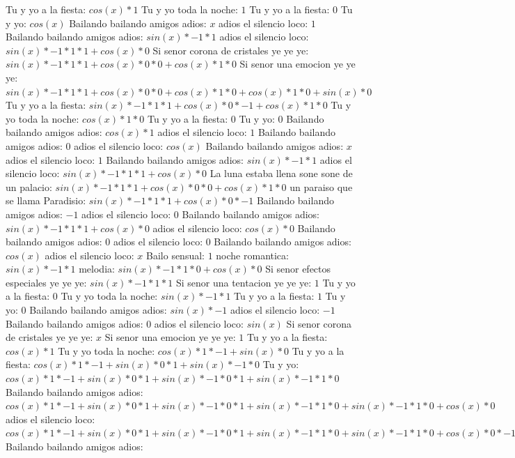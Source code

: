 \documentclass{article}
\begin{document}
\newline Tu y yo a la fiesta: $cos(x)*1$ Tu y yo toda la noche: $1$ Tu y yo a la fiesta: $0$  \newline Tu y yo: $cos(x)$  \newline Bailando bailando amigos adios: $x$ adios el silencio loco: $1$  \newline Bailando bailando amigos adios: $sin(x)*-1*1$ adios el silencio loco: $sin(x)*-1*1*1+cos(x)*0$ Si senor corona de cristales ye ye ye: ${sin(x)*-1*1*1+cos(x)*0}*0+cos(x)*1*0$ Si senor una emocion ye ye ye: ${sin(x)*-1*1*1+cos(x)*0}*0+cos(x)*1*0+cos(x)*1*0+sin(x)*0$ Tu y yo a la fiesta: ${sin(x)*-1*1*1+cos(x)*0}*-1+cos(x)*1*0$  \newline Tu y yo toda la noche: $cos(x)*1*0$ Tu y yo a la fiesta: $0$ Tu y yo: $0$  \newline Bailando bailando amigos adios: $cos(x)*1$ adios el silencio loco: $1$ Bailando bailando amigos adios: $0$  \newline adios el silencio loco: $cos(x)$  \newline Bailando bailando amigos adios: $x$ adios el silencio loco: $1$  \newline Bailando bailando amigos adios: $sin(x)*-1*1$ adios el silencio loco: $sin(x)*-1*1*1+cos(x)*0$ La luna estaba llena sone sone de un palacio: ${sin(x)*-1*1*1+cos(x)*0}*0+cos(x)*1*0$ un paraiso que se llama Paradisio: ${sin(x)*-1*1*1+cos(x)*0}*-1$ Bailando bailando amigos adios: $-1$ adios el silencio loco: $0$  \newline Bailando bailando amigos adios: $sin(x)*-1*1*1+cos(x)*0$  \newline adios el silencio loco: $cos(x)*0$ Bailando bailando amigos adios: $0$ adios el silencio loco: $0$  \newline Bailando bailando amigos adios: $cos(x)$  \newline adios el silencio loco: $x$ Bailo sensual: $1$  \newline noche romantica: $sin(x)*-1*1$ melodia: $sin(x)*-1*1*0+cos(x)*0$ Si senor efectos especiales ye ye ye: $sin(x)*-1*1*1$ Si senor una tentacion ye ye ye: $1$ Tu y yo a la fiesta: $0$  \newline Tu y yo toda la noche: $sin(x)*-1*1$ Tu y yo a la fiesta: $1$ Tu y yo: $0$  \newline Bailando bailando amigos adios: $sin(x)*-1$ adios el silencio loco: $-1$ Bailando bailando amigos adios: $0$  \newline adios el silencio loco: $sin(x)$  \newline Si senor corona de cristales ye ye ye: $x$ Si senor una emocion ye ye ye: $1$  \newline Tu y yo a la fiesta: $cos(x)*1$ Tu y yo toda la noche: $cos(x)*1*-1+sin(x)*0$ Tu y yo a la fiesta: ${cos(x)*1*-1+sin(x)*0}*1+sin(x)*-1*0$ Tu y yo: ${{cos(x)*1*-1+sin(x)*0}*1+sin(x)*-1*0}*1+sin(x)*-1*1*0$ Bailando bailando amigos adios: ${{cos(x)*1*-1+sin(x)*0}*1+sin(x)*-1*0}*1+sin(x)*-1*1*0+sin(x)*-1*1*0+cos(x)*0$ adios el silencio loco: ${{{cos(x)*1*-1+sin(x)*0}*1+sin(x)*-1*0}*1+sin(x)*-1*1*0+sin(x)*-1*1*0+cos(x)*0}*-1+{sin(x)*-1*1*1+cos(x)*0}*0$ Bailando bailando amigos adios: 
\end{document}
